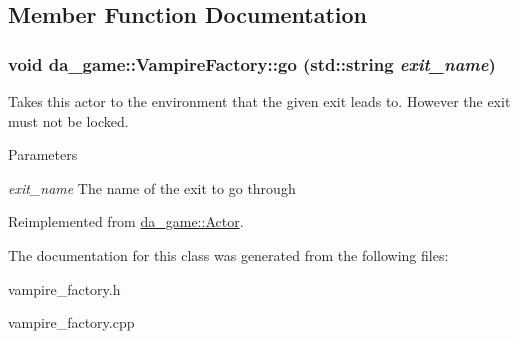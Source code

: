 \subsection{Member Function Documentation}
\hypertarget{classda__game_1_1VampireFactory_ab8f8fffebef4af1a90d00a0f011b245b}{
\subsubsection[{go}]{\setlength{\rightskip}{0pt plus 5cm}void da\_\-game::VampireFactory::go (std::string {\em exit\_\-name})}}
\label{classda__game_1_1VampireFactory_ab8f8fffebef4af1a90d00a0f011b245b}
Takes this actor to the environment that the given exit leads to. However the exit must not be locked.


\begin{DoxyParams}{Parameters}
\item[{\em exit\_\-name}]The name of the exit to go through \end{DoxyParams}


Reimplemented from \hyperlink{classda__game_1_1Actor_a6be7923ecbacabf779eda60f1f78bb72}{da\_\-game::Actor}.

The documentation for this class was generated from the following files:\begin{DoxyCompactItemize}
\item 
vampire\_\-factory.h\item 
vampire\_\-factory.cpp\end{DoxyCompactItemize}
